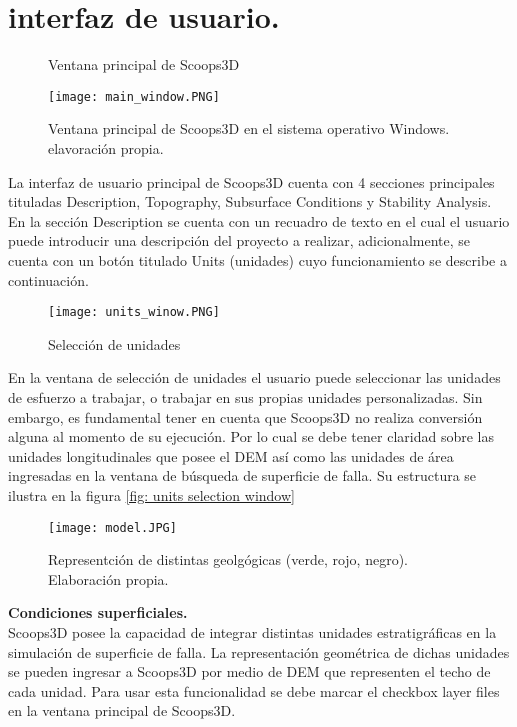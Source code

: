 \section{interfaz de usuario.}

\begin{figure}[h]
\caption{Ventana principal de Scoops3D}
\centering
\texttt{[image: main\_window.PNG]}
\caption{Ventana principal de Scoops3D en el sistema operativo Windows. elavoraci\'on propia.}
\label{fig:Interfaz de usuario}
\end{figure}

La interfaz de usuario principal de Scoops3D  cuenta con 4 secciones principales tituladas Description, Topography, Subsurface Conditions y Stability Analysis. En la secci\'{o}n Description se cuenta con un recuadro de texto en el cual el usuario puede introducir una descripci\'{o}n del proyecto a realizar, adicionalmente, se cuenta con un bot\'{o}n titulado Units (unidades) cuyo funcionamiento se describe a continuaci\'{o}n. \\

\begin{figure}[h]
\caption{Selecci\'{o}n de unidades}
\centering
\texttt{[image: units\_winow.PNG]}
\end{figure}


En la ventana de selecci\'{o}n de unidades el usuario puede seleccionar las unidades de
esfuerzo a trabajar, o trabajar en sus propias unidades personalizadas. Sin embargo, es
fundamental tener en cuenta que Scoops3D no realiza conversi\'{o}n alguna al momento de su
ejecuci\'{o}n. Por lo cual se debe tener claridad sobre las unidades longitudinales que posee el
DEM as\'{i} como las unidades de \'{a}rea ingresadas en la ventana de b\'{u}squeda de superficie de
falla. Su estructura se ilustra en la figura \ref{fig: units selection window}
\\
\begin{figure}[h]
\centering
\texttt{[image: model.JPG]}
\caption{Representci\'on de distintas geolg\'ogicas (verde, rojo, negro). Elaboraci\'on propia.}
\label{geo units}
\end{figure}


\textbf{Condiciones superficiales.}\\
Scoops3D posee la capacidad de integrar distintas unidades estratigr\'{a}ficas en la simulaci\'{o}n
de superficie de falla. La representaci\'{o}n geom\'{e}trica de dichas unidades se pueden ingresar
a Scoops3D por medio de DEM que representen el techo de cada unidad.
Para usar esta funcionalidad se debe marcar el checkbox layer files en la ventana principal
de Scoops3D.
\\


